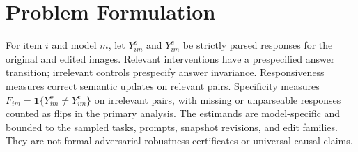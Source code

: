 \section{Problem Formulation}
For item $i$ and model $m$, let $Y^o_{im}$ and $Y^e_{im}$ be strictly parsed responses for the original
and edited images. Relevant interventions have a prespecified answer transition; irrelevant controls
prespecify answer invariance. Responsiveness measures correct semantic updates on relevant pairs.
Specificity measures $F_{im}=\mathbf{1}\{Y^o_{im}\ne Y^e_{im}\}$ on irrelevant pairs, with missing or
unparseable responses counted as flips in the primary analysis. The estimands are model-specific and
bounded to the sampled tasks, prompts, snapshot revisions, and edit families. They are not formal
adversarial robustness certificates or universal causal claims.
